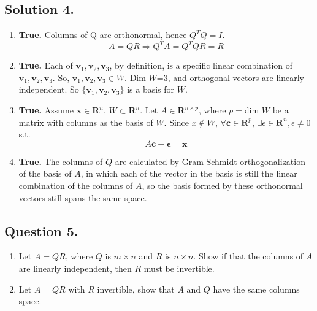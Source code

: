 \documentclass{article}
\begin{document}
\subsection*{Solution 4.}
\begin{enumerate} [label=(\arabic*)]
    \item \textbf{True.} \newline
    Columns of Q are orthonormal, hence $Q^TQ=I$.
    \[A=QR\Rightarrow Q^TA=Q^TQR=R\]
    \item \textbf{True.}\newline
    Each of $\mathbf{v}_1,\mathbf{v}_2,\mathbf{v}_3$, by definition, is a specific linear combination of $\mathbf{v}_1,\mathbf{v}_2,\mathbf{v}_3$. So, $\mathbf{v}_1,\mathbf{v}_2,\mathbf{v}_3\in W$. Dim $W$=3, and orthogonal vectors are  linearly independent. So $\{\mathbf{v}_1,\mathbf{v}_2,\mathbf{v}_3\}$ is a basis for $W$.
    \item \textbf{True.} \newline
    Assume $\mathbf{x}\in\mathbf{R}^n$, $W\subset \mathbf{R}^n$.
    Let $A\in \mathbf{R}^{n\times p}$, where $p=$dim $W$ be a matrix with columns as the basis of $W$.
    Since $x\notin W$, $\forall \mathbf{c}\in \mathbf{R}^p$, $\exists \epsilon\in\mathbf{R}^n,\epsilon\neq 0$ s.t.
    \[A\mathbf{c}+\mathbf{\epsilon}=\mathbf{x}\]
    \item \textbf{True.} \newline
    The columns of $Q$ are calculated by Gram-Schmidt orthogonalization of the basis of $A$, in which each of the vector in the basis is still the linear combination of the columns of $A$, so the basis formed by these orthonormal vectors still spans the same space.
\end{enumerate}
\subsection*{Question 5.}
\begin{enumerate} [label=(\arabic*)]
    \item Let $A=QR$, where $Q$ is $m\times n$ and $R$ is $n\times n$. Show if that the columns of $A$ are linearly independent, then $R$ must be invertible.
    \item Let $A=QR$ with $R$ invertible, show that $A$ and $Q$ have the same columns space.
\end{enumerate}
\end{document}
